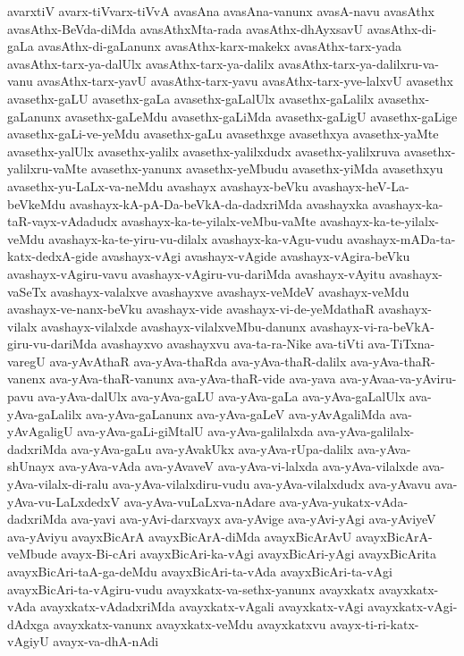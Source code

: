 {avarxtiV
avarx-tiVvarx-tiVvA
avasAna
avasAna-vanunx
avasA-navu
avasAthx
avasAthx-BeVda-diMda
avasAthxMta-rada
avasAthx-dhAyxsavU
avasAthx-di-gaLa
avasAthx-di-gaLanunx
avasAthx-karx-makekx
avasAthx-tarx-yada
avasAthx-tarx-ya-dalUlx
avasAthx-tarx-ya-dalilx
avasAthx-tarx-ya-dalilxru-va-vanu
avasAthx-tarx-yavU
avasAthx-tarx-yavu
avasAthx-tarx-yve-lalxvU
avasethx
avasethx-gaLU
avasethx-gaLa
avasethx-gaLalUlx
avasethx-gaLalilx
avasethx-gaLanunx
avasethx-gaLeMdu
avasethx-gaLiMda
avasethx-gaLigU
avasethx-gaLige
avasethx-gaLi-ve-yeMdu
avasethx-gaLu
avasethxge
avasethxya
avasethx-yaMte
avasethx-yalUlx
avasethx-yalilx
avasethx-yalilxdudx
avasethx-yalilxruva
avasethx-yalilxru-vaMte
avasethx-yanunx
avasethx-yeMbudu
avasethx-yiMda
avasethxyu
avasethx-yu-LaLx-va-neMdu
avashayx
avashayx-beVku
avashayx-heV-La-beVkeMdu
avashayx-kA-pA-Da-beVkA-da-dadxriMda
avashayxka
avashayx-ka-taR-vayx-vAdadudx
avashayx-ka-te-yilalx-veMbu-vaMte
avashayx-ka-te-yilalx-veMdu
avashayx-ka-te-yiru-vu-dilalx
avashayx-ka-vAgu-vudu
avashayx-mADa-ta-katx-dedxA-gide
avashayx-vAgi
avashayx-vAgide
avashayx-vAgira-beVku
avashayx-vAgiru-vavu
avashayx-vAgiru-vu-dariMda
avashayx-vAyitu
avashayx-vaSeTx
avashayx-valalxve
avashayxve
avashayx-veMdeV
avashayx-veMdu
avashayx-ve-nanx-beVku
avashayx-vide
avashayx-vi-de-yeMdathaR
avashayx-vilalx
avashayx-vilalxde
avashayx-vilalxveMbu-danunx
avashayx-vi-ra-beVkA-giru-vu-dariMda
avashayxvo
avashayxvu
ava-ta-ra-Nike
ava-tiVti
ava-TiTxna-varegU
ava-yAvAthaR
ava-yAva-thaRda
ava-yAva-thaR-dalilx
ava-yAva-thaR-vanenx
ava-yAva-thaR-vanunx
ava-yAva-thaR-vide
ava-yava
ava-yAvaa-va-yAviru-pavu
ava-yAva-dalUlx
ava-yAva-gaLU
ava-yAva-gaLa
ava-yAva-gaLalUlx
ava-yAva-gaLalilx
ava-yAva-gaLanunx
ava-yAva-gaLeV
ava-yAvAgaliMda
ava-yAvAgaligU
ava-yAva-gaLi-giMtalU
ava-yAva-galilalxda
ava-yAva-galilalx-dadxriMda
ava-yAva-gaLu
ava-yAvakUkx
ava-yAva-rUpa-dalilx
ava-yAva-shUnayx
ava-yAva-vAda
ava-yAvaveV
ava-yAva-vi-lalxda
ava-yAva-vilalxde
ava-yAva-vilalx-di-ralu
ava-yAva-vilalxdiru-vudu
ava-yAva-vilalxdudx
ava-yAvavu
ava-yAva-vu-LaLxdedxV
ava-yAva-vuLaLxva-nAdare
ava-yAva-yukatx-vAda-dadxriMda
ava-yavi
ava-yAvi-darxvayx
ava-yAvige
ava-yAvi-yAgi
ava-yAviyeV
ava-yAviyu
avayxBicArA
avayxBicArA-diMda
avayxBicArAvU
avayxBicArA-veMbude
avayx-Bi-cAri
avayxBicAri-ka-vAgi
avayxBicAri-yAgi
avayxBicArita
avayxBicAri-taA-ga-deMdu
avayxBicAri-ta-vAda
avayxBicAri-ta-vAgi
avayxBicAri-ta-vAgiru-vudu
avayxkatx-va-sethx-yanunx
avayxkatx
avayxkatx-vAda
avayxkatx-vAdadxriMda
avayxkatx-vAgali
avayxkatx-vAgi
avayxkatx-vAgi-dAdxga
avayxkatx-vanunx
avayxkatx-veMdu
avayxkatxvu
avayx-ti-ri-katx-vAgiyU
avayx-va-dhA-nAdi
}
